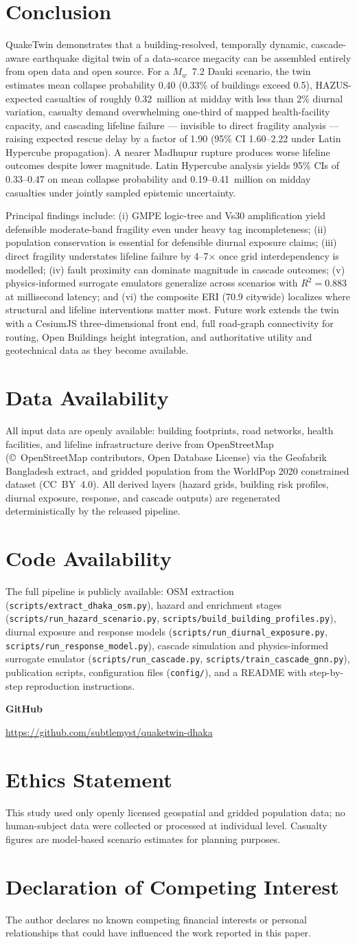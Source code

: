\documentclass[a4paper,fleqn]{cas-sc}
\newcommand{\githubrepo}{\url{https://github.com/subtlemyst/quaketwin-dhaka}}
\newcommand{\declarationspage}{%
  \clearpage
  \begingroup
  \raggedright
  \sloppy
  \setlength{\parskip}{0.5\baselineskip}
  \section*{Data Availability}
  All input data are openly available: building footprints, road networks, health facilities, and lifeline infrastructure derive from OpenStreetMap (\copyright\ OpenStreetMap contributors, Open Database License) via the Geofabrik Bangladesh extract, and gridded population from the WorldPop 2020 constrained dataset (CC~BY~4.0). All derived layers (hazard grids, building risk profiles, diurnal exposure, response, and cascade outputs) are regenerated deterministically by the released pipeline.

  \section*{Code Availability}
  \phantomsection\label{sec:code_availability}
  The full pipeline is publicly available: OSM extraction (\texttt{scripts/extract\_dhaka\_osm.py}), hazard and enrichment stages (\texttt{scripts/run\_hazard\_scenario.py}, \texttt{scripts/build\_building\_profiles.py}), diurnal exposure and response models (\texttt{scripts/run\_diurnal\_exposure.py}, \texttt{scripts/run\_response\_model.py}), cascade simulation and physics-informed surrogate emulator (\texttt{scripts/run\_cascade.py}, \texttt{scripts/train\_cascade\_gnn.py}), publication scripts, configuration files (\texttt{config/}), and a README with step-by-step reproduction instructions.\par\medskip
  \noindent\textbf{GitHub}\par
  \githubrepo

  \section*{Ethics Statement}
  This study used only openly licensed geospatial and gridded population data; no human-subject data were collected or processed at individual level. Casualty figures are model-based scenario estimates for planning purposes.

  \section*{Declaration of Competing Interest}
  The author declares no known competing financial interests or personal relationships that could have influenced the work reported in this paper.
  \endgroup
  \clearpage
}
\begin{document}
\section{Conclusion}
QuakeTwin demonstrates that a building-resolved, temporally dynamic,
cascade-aware earthquake digital twin of a data-scarce megacity can be
assembled entirely from open data and open source. For a $M_w$~7.2 Dauki
scenario, the twin estimates mean collapse probability 0.40 (0.33\% of
buildings exceed 0.5), HAZUS-expected casualties of roughly 0.32~million
at midday with less than 2\% diurnal variation, casualty demand overwhelming
one-third of mapped health-facility capacity, and cascading lifeline failure
--- invisible to direct fragility analysis --- raising expected rescue delay
by a factor of 1.90 (95\% CI 1.60--2.22 under Latin Hypercube propagation).
A nearer Madhupur rupture produces worse lifeline
outcomes despite lower magnitude. Latin Hypercube analysis yields 95\% CIs of
0.33--0.47 on mean collapse probability and 0.19--0.41~million on midday
casualties under jointly sampled epistemic uncertainty.

Principal findings include: (i) GMPE logic-tree and Vs30 amplification yield
defensible moderate-band fragility even under heavy tag incompleteness;
(ii) population conservation is essential for defensible diurnal exposure
claims; (iii) direct fragility understates lifeline failure by 4--7$\times$
once grid interdependency is modelled; (iv) fault proximity can dominate
magnitude in cascade outcomes; (v) physics-informed surrogate emulators generalize
across scenarios with $R^2 = 0.883$ at millisecond latency; and (vi) the composite ERI (70.9
citywide) localizes where structural and lifeline interventions matter most.
Future work extends the twin with a CesiumJS three-dimensional front end,
full road-graph connectivity for routing, Open Buildings height integration,
and authoritative utility and geotechnical data as they become available.

\declarationspage


\end{document}
